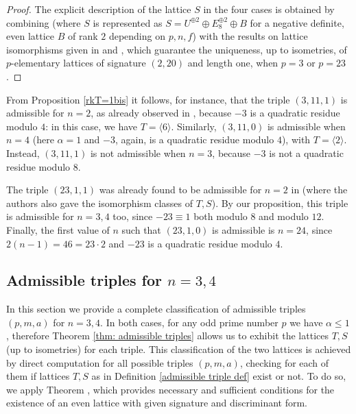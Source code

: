 \documentclass{amsart}
\theoremstyle{definition}
\begin{document}
\begin{proof}
The explicit description of the lattice $S$ in the four cases is obtained by combining \cite[Proposition 3.6]{ghs} (where $S$ is represented as $S=U^{\oplus 2}\oplus E_8^{\oplus 2}\oplus B$ for a negative definite, even lattice $B$ of rank $2$ depending on $p,n,f$) with the results on lattice isomorphisms given in \cite[Corollary 1.13.5]{nikulin} and \cite[\S 1]{rudakov-shafarevich}, which guarantee the uniqueness, up to isometries, of $p$-elementary lattices of signature $(2,20)$ and length one, when $p = 3$ or $p = 23$.
\end{proof}

From Proposition \ref{rkT=1bis} it follows, for instance, that the triple $(3,11,1)$ is admissible for $n=2$, as already observed in \cite{bcs}, because $-3$ is a quadratic residue modulo $4$: in this case, we have $T = \langle 6\rangle$. Similarly, $(3,11,0)$ is admissible when $n=4$ (here $\alpha=1$ and $-3$, again, is a quadratic residue modulo $4$), with $T = \langle 2\rangle$. Instead, $(3,11,1)$ is not admissible when $n=3$, because $-3$ is not a quadratic residue modulo $8$.

The triple $(23,1,1)$ was already found to be admissible for $n=2$ in \cite{bcms_p=23} (where the authors also gave the isomorphism classes of $T,S$). By our proposition, this triple is admissible for $n=3,4$ too, since $-23 \equiv 
1$ both modulo $8$ and modulo $12$. Finally, the first value of $n$ such that $(23,1,0)$ is admissible is $n = 24$, since $2(n-1) = 46 = 23 \cdot 2$ and $-23$ is a quadratic residue modulo $4$.

\subsection{Admissible triples for $n=3,4$} \label{subsect: classif for n=3,4}
In this section we provide a complete classification of admissible triples $(p,m,a)$ for $n=3,4$. In both cases, for any odd prime number $p$ we have $\alpha \leq 1$, therefore Theorem \ref{thm: admissible triples} allows us to exhibit the lattices $T, S$ (up to isometries) for each triple. This classification of the two lattices is achieved by direct computation for all possible triples $(p,m,a)$, checking for each of them if lattices $T, S$ as in Definition \ref{admissible triple def} exist or not. To do so, we apply Theorem \cite[Theorem 1.10.1]{nikulin}, which provides necessary and sufficient conditions for the existence of an even lattice with given signature and discriminant form.
\end{document}
